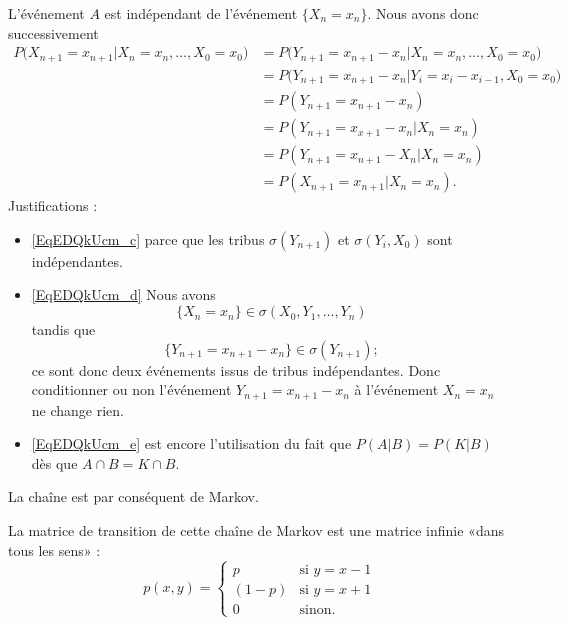 L'événement \( A\) est indépendant de l'événement \( \{ X_n=x_n \}\). Nous avons donc successivement
\begin{subequations}
    \begin{align}
        P\big( X_{n+1}=x_{n+1}| X_n=x_n,\ldots,X_0=x_0 \big)&=P\big( Y_{n+1}=x_{n+1}-x_n| X_n=x_n,\ldots,X_0=x_0 \big)\\
        &=P\big( Y_{n+1}=x_{n+1}-x_n|  Y_i=x_i-x_{i-1},X_0=x_0\big)\\
        &=P(Y_{n+1}=x_{n+1}-x_n)        \label{EqEDQkUcm_c}\\
        &=P(Y_{n+1}=x_{x+1}-x_n|X_n=x_n)    \label{EqEDQkUcm_d}\\
        &=P(Y_{n+1}=x_{n+1}-X_n|X_n=x_n)        \label{EqEDQkUcm_e}\\
        &=P(X_{n+1}=x_{n+1}|X_n=x_n).
    \end{align}
\end{subequations}
Justifications :
\begin{itemize}
    \item \eqref{EqEDQkUcm_c} parce que les tribus $\sigma(Y_{n+1})$ et \( \sigma(Y_i,X_0)\) sont indépendantes.
    \item \eqref{EqEDQkUcm_d} Nous avons
        \begin{equation}
    \{ X_n=x_n \}\in\sigma(X_0,Y_1,\ldots, Y_n)
\end{equation}
tandis que
\begin{equation}
    \{ Y_{n+1}=x_{n+1}-x_n \}\in\sigma(Y_{n+1});
\end{equation}
ce sont donc deux événements issus de tribus indépendantes. Donc conditionner ou non l'événement \( Y_{n+1}=x_{n+1}-x_n\) à l'événement \( X_n=x_n\) ne change rien.
\item \eqref{EqEDQkUcm_e} est encore l'utilisation du fait que \( P(A|B)=P(K|B)\) dès que \( A\cap B=K\cap B\).

\end{itemize}

La chaîne est par conséquent de Markov.

La matrice de transition de cette chaîne de Markov est une matrice infinie «dans tous les sens» :
\begin{equation}
    p(x,y)=\begin{cases}
        p    &   \text{si }y=x-1\\
        (1-p)    &    \text{si }y=x+1\\
        0    &   \text{sinon}.
    \end{cases}
\end{equation}

